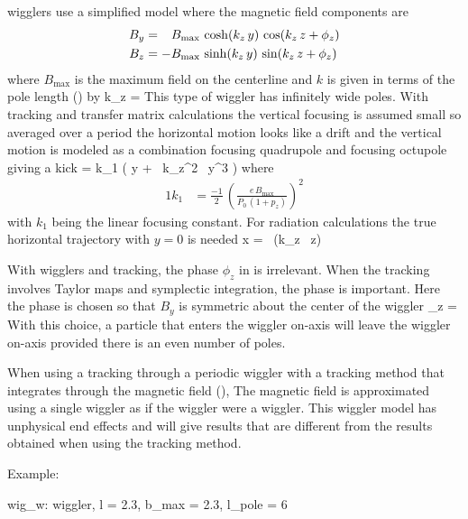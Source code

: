 { wigglers use a simplified model where the magnetic
field components are
\begin{alignat}{1}
  B_y &= \hphantom{-} B_{\max} \, \cosh(k_z \, y) \, \cos(k_z \, z + \phi_z) \nonumber \\
  B_z &= -B_{\max} \, \sinh(k_z \, y) \, \sin(k_z \, z + \phi_z) 
  \label{bbkykz}
\end{alignat}
where $B_{\max}$ is the maximum field on the centerline and $k$ is
given in terms of the pole length () by
\Begineq
  k_z = 
\Endeq
This type of wiggler has infinitely wide poles. With
 tracking and transfer matrix calculations the
vertical focusing is assumed small so averaged over a period the
horizontal motion looks like a drift and the vertical motion is
modeled as a combination focusing quadrupole and focusing octupole
giving a kick\cite{b:corbett}
\Begineq
   = k_1 \left( y +  \, k_z^2 \, y^3 \right)
\Endeq
where
\begin{alignat}{1}
  k_1 &= \frac{-1}{2} \, \left( \frac{e \, B_{\max}}{P_0 \, (1 + p_z)} \right)^2 
\end{alignat}
with $k_1$ being the linear focusing constant. For radiation
calculations the true horizontal trajectory with $y = 0$ is needed
\Begineq
  x =  \, \cos (k_z \, z)
\Endeq

With  wigglers and 
tracking, the phase $\phi_z$ in  is irrelevant. When the
tracking involves Taylor maps and symplectic integration, the phase is
important. Here the phase is chosen so that $B_y$ is symmetric about
the center of the wiggler
\Begineq
  \phi_z = 
\Endeq
With this choice, a particle that enters the wiggler on-axis will
leave the wiggler on-axis provided there is an even number of poles.

When using a tracking through a periodic wiggler with a tracking
method that integrates through the magnetic field (),
The magnetic field is approximated using a single wiggler  as
if the wiggler were a  wiggler. This wiggler model has
unphysical end effects and will give results that are different from
the results obtained when using the  tracking
method. 

Example:
\begin{example}
  wig_w: wiggler, l = 2.3, b_max = 2.3, l_pole = 6
\end{example}

}
